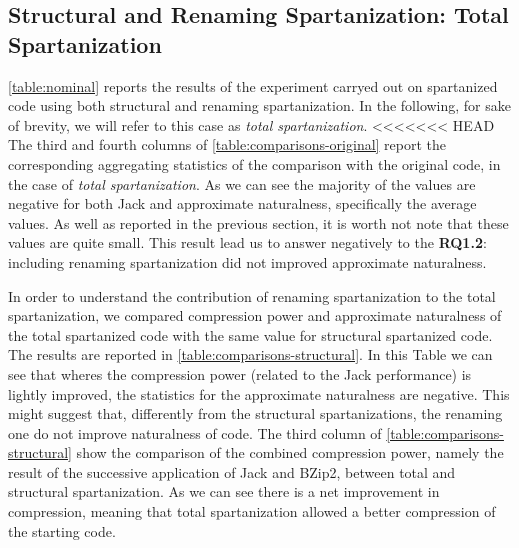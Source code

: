 \subsection{Structural and Renaming Spartanization: Total Spartanization}

\cref{table:nominal} reports the results of the experiment carryed out on
spartanized code using both structural and renaming spartanization.
In the following, for sake of brevity, we will refer to this case as \emph{total spartanization}.
<<<<<<< HEAD
The third and fourth columns of \cref{table:comparisons-original} report the corresponding
aggregating statistics of the comparison with the original code, in the case of
\emph{total spartanization}.
As we can see the majority of the values are negative for both Jack and approximate naturalness,
specifically the average values. As well as reported in the previous section, it is worth not note that
these values are quite small.
This result lead us to answer negatively to the \textbf{RQ1.2}: including renaming spartanization
did not improved approximate naturalness.

In order to understand the contribution of renaming spartanization to the total spartanization,
we compared compression power and approximate naturalness of the total spartanized code
with the same value for structural spartanized code.
The results are reported in \cref{table:comparisons-structural}. In this Table we
can see that wheres the compression power (related to the Jack performance)
is lightly improved, the statistics for the approximate naturalness are negative.
This might suggest that, differently from the structural spartanizations, the renaming one
do not improve naturalness of code.
The third column of \cref{table:comparisons-structural} show the comparison of the combined
compression power, namely the result of the successive application of Jack and BZip2,
between total and structural spartanization. As we can see there is a net improvement in
compression, meaning that total spartanization allowed a better compression of the starting code.

